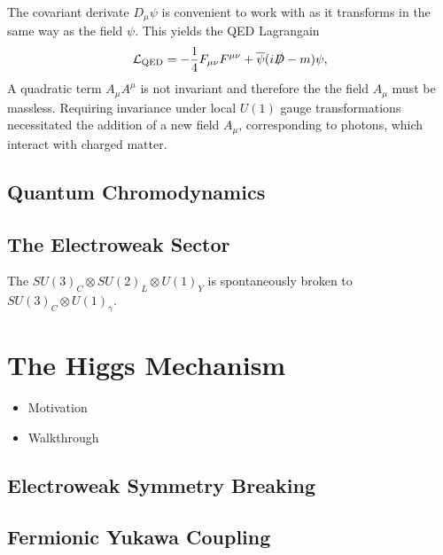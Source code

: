 The covariant derivate $D_\mu \psi$ is convenient to work with as it transforms in the same way as the field $\psi$.
This yields the QED Lagrangain
%
\begin{equation}\label{eq:qed_lagrangian}
  \mathcal{L}_{\textnormal{QED}} = -\frac{1}{4} F_{\mu\nu} F^{\mu\nu} + \overline{\psi} (i \slashed{D} - m )\psi,
\end{equation}
%
A quadratic term $A_\mu A^\mu$ is not invariant and therefore the the field $A_\mu$ must be massless.
Requiring invariance under local $U(1)$ gauge transformations necessitated the addition of a new field $A_\mu$, corresponding to photons, which interact with charged matter.


\subsection{Quantum Chromodynamics}\label{sec:qcd}

\subsection{The Electroweak Sector}\label{sec:ew_sector}

The $SU(3)_C \otimes SU(2)_L \otimes U(1)_Y$ is spontaneously broken to $SU(3)_C \otimes U(1)_\gamma$.

\section{The Higgs Mechanism}\label{sec:sm_higgs}

\begin{itemize}
  \item Motivation
  \item Walkthrough
\end{itemize}

\subsection{Electroweak Symmetry Breaking}\label{sec:ew_symmetry_breaking}
\subsection{Fermionic Yukawa Coupling}\label{sec:higgs_yukawa_coupling}

